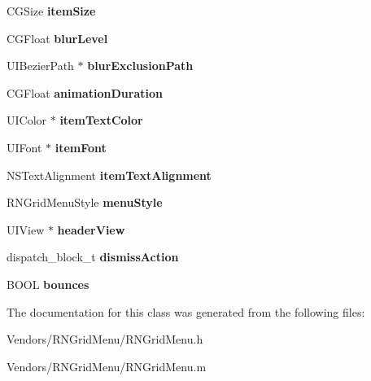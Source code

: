 \begin{DoxyCompactItemize}
\item 
\hypertarget{interface_r_n_grid_menu_ad923b4999eb6c9c4deece32640bdbca3}{}C\+G\+Size {\bfseries item\+Size}\label{interface_r_n_grid_menu_ad923b4999eb6c9c4deece32640bdbca3}

\item 
\hypertarget{interface_r_n_grid_menu_acf88efa0571dbc59cb032f7f063f993d}{}C\+G\+Float {\bfseries blur\+Level}\label{interface_r_n_grid_menu_acf88efa0571dbc59cb032f7f063f993d}

\item 
\hypertarget{interface_r_n_grid_menu_a8a3d1b271c8cddf9e2113fefb88de774}{}U\+I\+Bezier\+Path $\ast$ {\bfseries blur\+Exclusion\+Path}\label{interface_r_n_grid_menu_a8a3d1b271c8cddf9e2113fefb88de774}

\item 
\hypertarget{interface_r_n_grid_menu_af96c52d29de1a616ce225c263d0adfe4}{}C\+G\+Float {\bfseries animation\+Duration}\label{interface_r_n_grid_menu_af96c52d29de1a616ce225c263d0adfe4}

\item 
\hypertarget{interface_r_n_grid_menu_af0cb2d28e15ee785b98318783f4a98ce}{}U\+I\+Color $\ast$ {\bfseries item\+Text\+Color}\label{interface_r_n_grid_menu_af0cb2d28e15ee785b98318783f4a98ce}

\item 
\hypertarget{interface_r_n_grid_menu_aecce2bcc68410b07f9f318e377b8ba37}{}U\+I\+Font $\ast$ {\bfseries item\+Font}\label{interface_r_n_grid_menu_aecce2bcc68410b07f9f318e377b8ba37}

\item 
\hypertarget{interface_r_n_grid_menu_ae105f9100eae61a3c408ad89f767c3d1}{}N\+S\+Text\+Alignment {\bfseries item\+Text\+Alignment}\label{interface_r_n_grid_menu_ae105f9100eae61a3c408ad89f767c3d1}

\item 
\hypertarget{interface_r_n_grid_menu_a355608a3c957c59c150a5709aedb17fc}{}R\+N\+Grid\+Menu\+Style {\bfseries menu\+Style}\label{interface_r_n_grid_menu_a355608a3c957c59c150a5709aedb17fc}

\item 
\hypertarget{interface_r_n_grid_menu_af41c772625c10570a701e2c5362a73d5}{}U\+I\+View $\ast$ {\bfseries header\+View}\label{interface_r_n_grid_menu_af41c772625c10570a701e2c5362a73d5}

\item 
\hypertarget{interface_r_n_grid_menu_a69f33b664ef1492c2d75f8e2836f8c1e}{}dispatch\+\_\+block\+\_\+t {\bfseries dismiss\+Action}\label{interface_r_n_grid_menu_a69f33b664ef1492c2d75f8e2836f8c1e}

\item 
\hypertarget{interface_r_n_grid_menu_a9bf1da2ea3ff328c138ac5c87a2d3aa9}{}B\+O\+O\+L {\bfseries bounces}\label{interface_r_n_grid_menu_a9bf1da2ea3ff328c138ac5c87a2d3aa9}

\end{DoxyCompactItemize}


The documentation for this class was generated from the following files\+:\begin{DoxyCompactItemize}
\item 
Vendors/\+R\+N\+Grid\+Menu/R\+N\+Grid\+Menu.\+h\item 
Vendors/\+R\+N\+Grid\+Menu/R\+N\+Grid\+Menu.\+m\end{DoxyCompactItemize}
